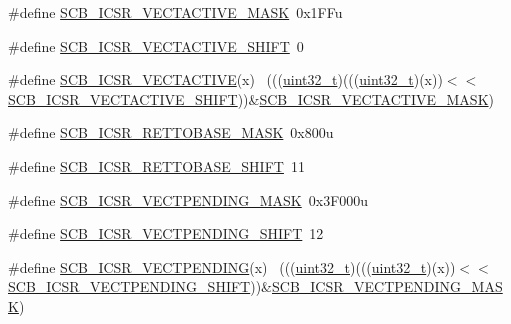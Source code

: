 \begin{DoxyCompactItemize}
\item 
\#define \hyperlink{group___s_c_b___register___masks_ga5818ac6e0642a5053dd525d82623054b}{S\+C\+B\+\_\+\+I\+C\+S\+R\+\_\+\+V\+E\+C\+T\+A\+C\+T\+I\+V\+E\+\_\+\+M\+A\+SK}~0x1\+F\+Fu
\item 
\#define \hyperlink{group___s_c_b___register___masks_ga02696369c8528292cf4f41897d83b156}{S\+C\+B\+\_\+\+I\+C\+S\+R\+\_\+\+V\+E\+C\+T\+A\+C\+T\+I\+V\+E\+\_\+\+S\+H\+I\+FT}~0
\item 
\#define \hyperlink{group___s_c_b___register___masks_gacb9e76e7fa9000878ba2be80556f2013}{S\+C\+B\+\_\+\+I\+C\+S\+R\+\_\+\+V\+E\+C\+T\+A\+C\+T\+I\+VE}(x)                                  ~(((\hyperlink{_p_e___types_8h_a33594304e786b158f3fb30289278f5af}{uint32\+\_\+t})(((\hyperlink{_p_e___types_8h_a33594304e786b158f3fb30289278f5af}{uint32\+\_\+t})(x))$<$$<$\hyperlink{group___s_c_b___register___masks_ga02696369c8528292cf4f41897d83b156}{S\+C\+B\+\_\+\+I\+C\+S\+R\+\_\+\+V\+E\+C\+T\+A\+C\+T\+I\+V\+E\+\_\+\+S\+H\+I\+FT}))\&\hyperlink{group___s_c_b___register___masks_ga5818ac6e0642a5053dd525d82623054b}{S\+C\+B\+\_\+\+I\+C\+S\+R\+\_\+\+V\+E\+C\+T\+A\+C\+T\+I\+V\+E\+\_\+\+M\+A\+SK})
\item 
\#define \hyperlink{group___s_c_b___register___masks_gacda381108ff1ef433d9eb72675daa756}{S\+C\+B\+\_\+\+I\+C\+S\+R\+\_\+\+R\+E\+T\+T\+O\+B\+A\+S\+E\+\_\+\+M\+A\+SK}~0x800u
\item 
\#define \hyperlink{group___s_c_b___register___masks_ga45dfe30e87627611e59ecb380dea9b54}{S\+C\+B\+\_\+\+I\+C\+S\+R\+\_\+\+R\+E\+T\+T\+O\+B\+A\+S\+E\+\_\+\+S\+H\+I\+FT}~11
\item 
\#define \hyperlink{group___s_c_b___register___masks_ga75b38d5feedc920a7d0a51484330b7d7}{S\+C\+B\+\_\+\+I\+C\+S\+R\+\_\+\+V\+E\+C\+T\+P\+E\+N\+D\+I\+N\+G\+\_\+\+M\+A\+SK}~0x3\+F000u
\item 
\#define \hyperlink{group___s_c_b___register___masks_ga345baf83f90de34c6c67edb24968fcc7}{S\+C\+B\+\_\+\+I\+C\+S\+R\+\_\+\+V\+E\+C\+T\+P\+E\+N\+D\+I\+N\+G\+\_\+\+S\+H\+I\+FT}~12
\item 
\#define \hyperlink{group___s_c_b___register___masks_ga17bdf1522c873773ad5e72052f2591c6}{S\+C\+B\+\_\+\+I\+C\+S\+R\+\_\+\+V\+E\+C\+T\+P\+E\+N\+D\+I\+NG}(x)                                ~(((\hyperlink{_p_e___types_8h_a33594304e786b158f3fb30289278f5af}{uint32\+\_\+t})(((\hyperlink{_p_e___types_8h_a33594304e786b158f3fb30289278f5af}{uint32\+\_\+t})(x))$<$$<$\hyperlink{group___s_c_b___register___masks_ga345baf83f90de34c6c67edb24968fcc7}{S\+C\+B\+\_\+\+I\+C\+S\+R\+\_\+\+V\+E\+C\+T\+P\+E\+N\+D\+I\+N\+G\+\_\+\+S\+H\+I\+FT}))\&\hyperlink{group___s_c_b___register___masks_ga75b38d5feedc920a7d0a51484330b7d7}{S\+C\+B\+\_\+\+I\+C\+S\+R\+\_\+\+V\+E\+C\+T\+P\+E\+N\+D\+I\+N\+G\+\_\+\+M\+A\+SK})

\end{DoxyCompactItemize}
